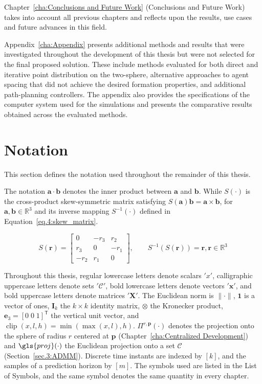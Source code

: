Chapter~\ref{cha:Conclusions and Future Work} (Conclusions and Future Work) takes into account all previous chapters and reflects upon the results, use cases and future advances in this field. 

Appendix~\ref{cha:Appendix} presents additional methods and results that were investigated throughout the development of this thesis but were not selected for the final proposed solution. These include methods evaluated for both direct and iterative point distribution on the two-sphere, alternative approaches to agent spacing that did not achieve the desired formation properties, and additional path-planning controllers. The appendix also provides the specifications of the computer system used for the simulations and presents the comparative results obtained across the evaluated methods.

\section{Notation}

This section defines the notation used throughout the remainder of this thesis.

The notation $\mathbf{a} \cdot \mathbf{b}$ denotes the inner product between $\mathbf{a}$ and $\mathbf{b}$. While $S(\cdot)$ is the cross-product skew-symmetric matrix satisfying $S(\mathbf{a}) \mathbf{b} = \mathbf{a} \times \mathbf{b}$, for $\mathbf{a},\mathbf{b}\in\mathbb{R}^3$ and its inverse mapping $S^{-1}(\cdot)$ defined in Equation~\eqref{eq.4:skew_matrix}.

\begin{equation}
    S(\mathbf{r})
=
\begin{bmatrix}
0 & -r_3 & r_2 \\
r_3 & 0 & -r_1 \\
-r_2 & r_1 & 0
\end{bmatrix},
\qquad
S^{-1}\left(S(\mathbf{r})\right) = \mathbf{r}, \mathbf{r} \in \mathbb{R}^3
\label{eq.4:skew_matrix}
\end{equation}

Throughout this thesis, regular lowercase letters denote scalars $'x'$, calligraphic uppercase letters denote sets $'\mathcal{C}'$, bold lowercase letters denote vectors $'\mathbf{x}'$, and bold uppercase letters denote matrices $'\mathbf{X}'$. The Euclidean norm is $\|\cdot\|$, $\mathbf{1}$ is a vector of ones, $\mathbf{I}_k$ the $k\times k$ identity matrix, $\otimes$ the Kronecker product, $\mathbf{e}_3=[0\;0\;1]^{\mathsf T}$ the vertical unit vector, and $\operatorname{clip}(x,l,h)=\min(\max(x,l),h)$. $\Pi^{r,\mathbf{p}}(\cdot)$ denotes the projection onto the sphere of radius $r$ centered at $\mathbf{p}$ (Chapter~\ref{cha:Centralized Development}) and $\gls{proj}(\cdot)$ the Euclidean projection onto a set $\mathcal{C}$ (Section~\ref{sec.3:ADMM}). Discrete time instants are indexed by $[k]$, and the samples of a prediction horizon by $[m]$. The symbols used are listed in the List of Symbols, and the same symbol denotes the same quantity in every chapter.


